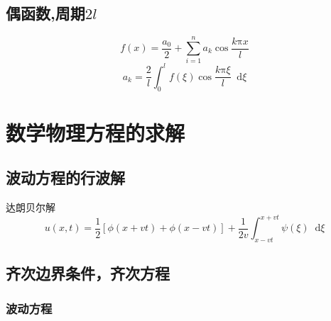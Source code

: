 \documentclass{article}
\newcommand*{\md}{\mathop{}\!\mathrm{d}}
\begin{document}
\subsection{偶函数,周期$2l$}

\begin{equation*}
  f(x) = \dfrac{a_{0}}{2} + \sum\limits_{i=1}^{n}a_{k} \cos \dfrac{k \mathrm{\pi} x}{l} 
\end{equation*}
\begin{equation*}
  a_{k} = \dfrac{2}{l} \int_{0}^{l} f(\xi) \cos \dfrac{k \mathrm{\pi} \xi}{l} \md \xi 
\end{equation*}

\section{数学物理方程的求解}
\subsection{波动方程的行波解}

达朗贝尔解
\begin{equation*}
  u(x,t) = \dfrac{1}{2} \left[ \phi (x + vt) + \phi (x - vt) \right] + \dfrac{1}{2v} \int_{x-vt}^{x+vt} \psi(\xi) \md \xi
\end{equation*}


\subsection{齐次边界条件，齐次方程}

\subsubsection{波动方程}
\end{document}
